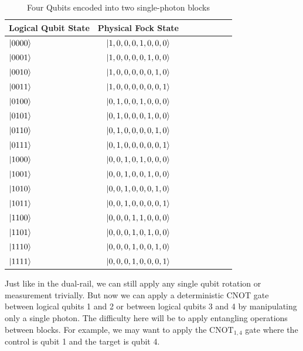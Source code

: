 \documentclass[aps,pra,twocolumn,showpacs,superscriptaddress,floatfix,10pt]{revtex4}
\begin{document}
\begin {table}[h]
\begin{center}
	\begin{tabular}{l*{6}{c}r} 
		Logical Qubit State      \quad \quad \quad     & Physical Fock State \\
		\hline 
		\quad \quad \quad $\ket{0000}$     & $\ket{1,0,0,0,1,0,0,0}$ \\
		\quad \quad \quad $\ket{0001}$            & $\ket{1,0,0,0,0,1,0,0}$ \\
		\quad \quad \quad $\ket{0010}$           & 
		$\ket{1,0,0,0,0,0,1,0}$ \\
		\quad \quad \quad $\ket{0011}$           & 
		$\ket{1,0,0,0,0,0,0,1}$ \\
		\quad \quad \quad $\ket{0100}$           & 
		$\ket{0,1,0,0,1,0,0,0}$ \\
		\quad \quad \quad $\ket{0101}$           & 
		$\ket{0,1,0,0,0,1,0,0}$ \\
		\quad \quad \quad $\ket{0110}$           & 
		$\ket{0,1,0,0,0,0,1,0}$ \\
		\quad \quad \quad $\ket{0111}$            & $\ket{0,1,0,0,0,0,0,1}$ \\
		\quad \quad \quad $\ket{1000}$            & $\ket{0,0,1,0,1,0,0,0}$ \\
		\quad \quad \quad $\ket{1001}$            & $\ket{0,0,1,0,0,1,0,0}$ \\
		\quad \quad \quad $\ket{1010}$            & $\ket{0,0,1,0,0,0,1,0}$ \\
		\quad \quad \quad $\ket{1011}$            & $\ket{0,0,1,0,0,0,0,1}$ \\
		\quad \quad \quad $\ket{1100}$            & $\ket{0,0,0,1,1,0,0,0}$ \\
		\quad \quad \quad $\ket{1101}$            & $\ket{0,0,0,1,0,1,0,0}$ \\
		\quad \quad \quad $\ket{1110}$            & $\ket{0,0,0,1,0,0,1,0}$ \\
		\quad \quad \quad $\ket{1111}$            & $\ket{0,0,0,1,0,0,0,1}$ \\
	\end{tabular}
	\caption{ \label{Block Encoding Table} Four Qubits encoded into two single-photon blocks}
\end{center}
\end{table}
Just like in the dual-rail, we can still apply any single qubit rotation or measurement trivially. But now we can apply a deterministic CNOT gate between logical qubits 1 and 2 or between logical qubits 3 and 4 by manipulating only a single photon. The difficulty here will be to apply entangling operations between blocks. For example, we may want to apply the $\mbox{CNOT}_{1,4}$ gate where the control is qubit 1 and the target is qubit 4.
\end{document}
